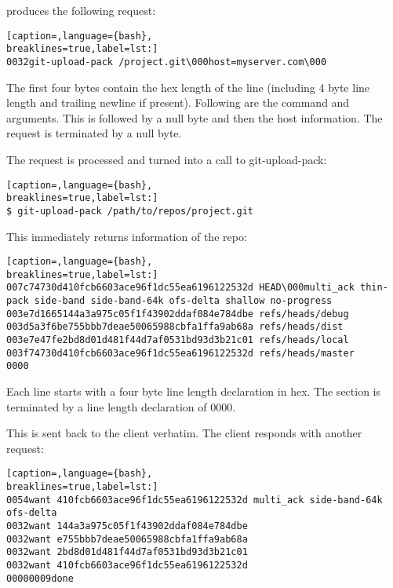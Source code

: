 produces the following request:
\lstset{basicstyle=\scriptsize, numbers=none, captionpos=b, tabsize=4}
\begin{lstlisting}[caption=,language={bash},
breaklines=true,label=lst:]
0032git-upload-pack /project.git\000host=myserver.com\000
\end{lstlisting}

The first four bytes contain the hex length of the line (including 4 byte line
length and trailing newline if present). Following are the command and
arguments. This is followed by a null byte and then the host information. The
request is terminated by a null byte.

The request is processed and turned into a call to git-upload-pack:
\lstset{basicstyle=\scriptsize, numbers=none, captionpos=b, tabsize=4}
\begin{lstlisting}[caption=,language={bash},
breaklines=true,label=lst:]
$ git-upload-pack /path/to/repos/project.git
\end{lstlisting}

This immediately returns information of the repo:
\lstset{basicstyle=\scriptsize, numbers=none, captionpos=b, tabsize=4}
\begin{lstlisting}[caption=,language={bash},
breaklines=true,label=lst:]
007c74730d410fcb6603ace96f1dc55ea6196122532d HEAD\000multi_ack thin-pack side-band side-band-64k ofs-delta shallow no-progress
003e7d1665144a3a975c05f1f43902ddaf084e784dbe refs/heads/debug
003d5a3f6be755bbb7deae50065988cbfa1ffa9ab68a refs/heads/dist
003e7e47fe2bd8d01d481f44d7af0531bd93d3b21c01 refs/heads/local
003f74730d410fcb6603ace96f1dc55ea6196122532d refs/heads/master
0000
\end{lstlisting}

Each line starts with a four byte line length declaration in hex. The section
is terminated by a line length declaration of 0000.

This is sent back to the client verbatim. The client responds with another
request:
\lstset{basicstyle=\scriptsize, numbers=none, captionpos=b, tabsize=4}
\begin{lstlisting}[caption=,language={bash},
breaklines=true,label=lst:]
0054want 410fcb6603ace96f1dc55ea6196122532d multi_ack side-band-64k ofs-delta
0032want 144a3a975c05f1f43902ddaf084e784dbe
0032want e755bbb7deae50065988cbfa1ffa9ab68a
0032want 2bd8d01d481f44d7af0531bd93d3b21c01
0032want 410fcb6603ace96f1dc55ea6196122532d
00000009done
\end{lstlisting}

